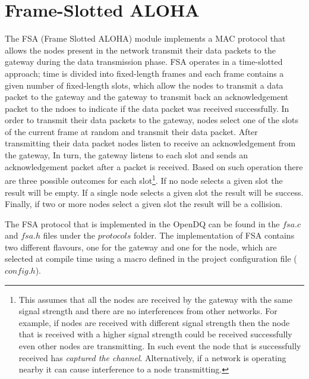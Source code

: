 \section{Frame-Slotted ALOHA}
\label{sec:06-fsa}
The FSA (Frame Slotted ALOHA) module implements a MAC protocol that allows the nodes present in the network transmit their data packets to the gateway during the data transmission phase. FSA operates in a time-slotted approach; time is divided into fixed-length frames and each frame contains a given number of fixed-length slots, which allow the nodes to transmit a data packet to the gateway and the gateway to transmit back an acknowledgement packet to the ndoes to indicate if the data packet was received successfully. In order to transmit their data packets to the gateway, nodes select one of the slots of the current frame at random and transmit their data packet. After transmitting their data packet nodes listen to receive an acknowledgement from the gateway, In turn, the gateway listens to each slot and sends an acknowledgement packet after a packet is received. Based on such operation there are three possible outcomes for each slot\footnote{This assumes that all the nodes are received by the gateway with the same signal strength and there are no interferences from other networks. For example, if nodes are received with different signal strength then the node that is received with a higher signal strength could be received successfully even other nodes are transmitting. In such event the node that is successfully received has \textit{captured the channel}. Alternatively, if a network is operating nearby it can cause interference to a node transmitting.}. If no node selects a given slot the result will be empty. If a single node selects a given slot the result will be success. Finally, if two or more nodes select a given slot the result will be a collision. 


The FSA protocol that is implemented in the OpenDQ can be found in the $fsa.c$ and $fsa.h$ files under the $protocols$ folder. The implementation of FSA contains two different flavours, one for the gateway and one for the node, which are selected at compile time using a macro defined in the project configuration file ($config.h$).

